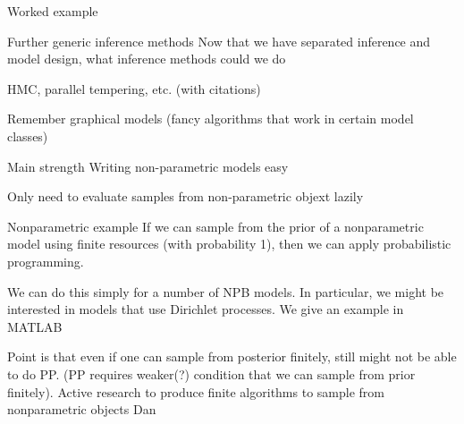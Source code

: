 \begin{frame}{Worked example}
\end{frame}

\begin{frame}{Further generic inference methods}
Now that we have separated inference and model design, what inference methods could we do

\eg HMC, parallel tempering, etc. (with citations)

Remember graphical models (fancy algorithms that work in certain model classes)
\end{frame}

\begin{frame}{Main strength}
Writing non-parametric models easy

Only need to evaluate samples from non-parametric objext lazily
\end{frame}

\begin{frame}{Nonparametric example}
If we can sample from the prior of a nonparametric model using finite resources (with probability 1), then we can apply probabilistic programming.
\newline

We can do this simply for a number of NPB models. In particular, we might be interested in models that use Dirichlet processes. We give an example in MATLAB
\newline

Point is that even if one can sample from posterior finitely, still might not be able to do PP. (PP requires weaker(?) condition that we can sample from prior finitely). Active research to produce finite algorithms to sample from nonparametric objects \eg Dan
\end{frame}

